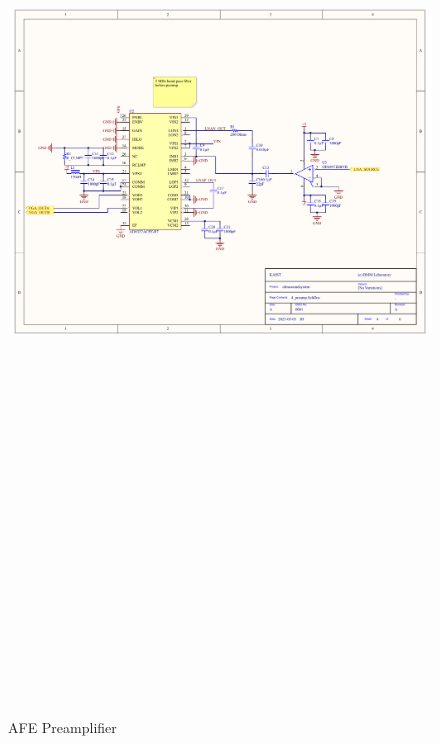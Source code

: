 \begin{landscape}
	\begin{figure}[htbp]
		\centering
		\includegraphics[width=20cm,height=28.7cm,keepaspectratio]{Figures/appendix/afe_altium/4_preamp.pdf}
		\caption{AFE Preamplifier}
		\label{fig:appendix_4_preamp}
	\end{figure}
\end{landscape}
